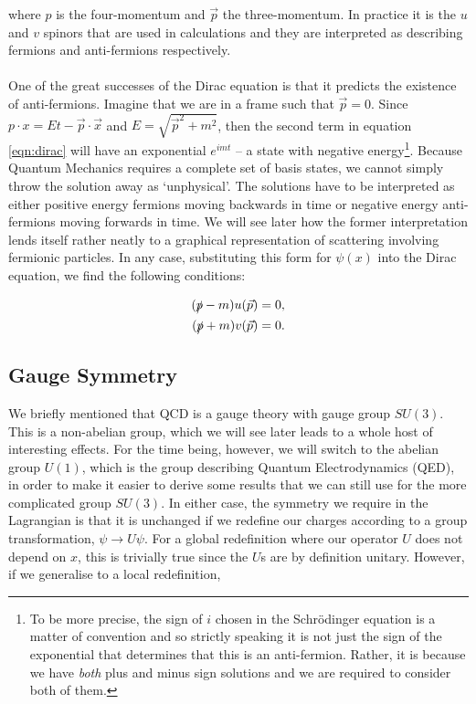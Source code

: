 where $p$ is the four-momentum and $\vec{p}$ the three-momentum. In practice it is the $u$ and $v$ spinors that are used in calculations and they are interpreted as describing fermions and anti-fermions respectively. \\
\\
One of the great successes of the Dirac equation is that it predicts the existence of anti-fermions. Imagine that we are in a frame such that $\vec{p} = 0$. Since $p \cdot x = Et - \vec{p}\cdot \vec{x}$ and $E = \sqrt{\vec{p}^2 + m^2}$, then the second term in equation \ref{eqn:dirac} will have an exponential $e^{i m t}$ -- a state with negative energy\footnote{To be more precise, the sign of $i$ chosen in the Schr\"odinger equation is a matter of convention and so strictly speaking it is not just the sign of the exponential that determines that this is an anti-fermion. Rather, it is because we have \emph{both} plus and minus sign solutions and we are required to consider both of them.}. Because Quantum Mechanics requires a complete set of basis states, we cannot simply throw the solution away as `unphysical'. The solutions have to be interpreted as either positive energy fermions moving backwards in time or negative energy anti-fermions moving forwards in time. We will see later how the former interpretation lends itself rather neatly to a graphical representation of scattering involving fermionic particles. In any case, substituting this form for $\psi(x)$ into the Dirac equation, we find the following conditions:

\begin{subequations}
\begin{align}
(\slashed{p} - m)u(\vec{p}) &= 0, \\
(\slashed{p} + m)v(\vec{p}) &= 0.
\end{align}
\end{subequations}


\subsection{Gauge Symmetry}

We briefly mentioned that QCD is a gauge theory with gauge group $SU(3)$. This is a non-abelian group, which we will see later leads to a whole host of interesting effects. For the time being, however, we will switch to the abelian group $U(1)$, which is the group describing Quantum Electrodynamics (QED), in order to make it easier to derive some results that we can still use for the more complicated group $SU(3)$. In either case, the symmetry we require in the Lagrangian is that it is unchanged if we redefine our charges according to a group transformation, $\psi \to U \psi$. For a global redefinition where our operator $U$ does not depend on $x$, this is trivially true since the $U$s are by definition unitary. However, if we generalise to a local redefinition,

